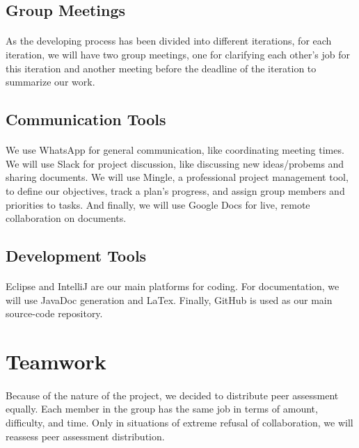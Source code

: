 \documentclass[11pt, a4paper]{article}
\begin{document}
\subsection{Group Meetings}\label{gm}
\paragraph{}
As the developing process has been divided into different iterations, for each iteration, we will have two group meetings, one for clarifying each other's job for this iteration and another meeting before the deadline of the iteration to summarize our work.

\subsection{Communication Tools}\label{comm:tools}
\paragraph{}
We use WhatsApp for general communication, like coordinating meeting times. We will use Slack for project discussion, like discussing new ideas/probems and sharing documents. We will use Mingle, a professional project management tool, to define our objectives, track a plan's progress, and assign group members and priorities to tasks. And finally, we will use Google Docs for live, remote collaboration on documents.
\subsection{Development Tools}\label{dev:tools}
\paragraph{}
Eclipse and IntelliJ are our main platforms for coding. For documentation, we will use JavaDoc generation and LaTex. Finally, GitHub is used as our main source-code repository.

\section{Teamwork}\label{team}
\paragraph{}
Because of the nature of the project, we decided to distribute peer assessment equally. Each member in the group has the same job in terms of amount, difficulty, and time. Only in situations of extreme refusal of collaboration, we will reassess peer assessment distribution.
\end{document}

